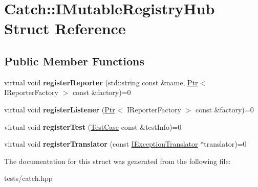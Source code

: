 \hypertarget{struct_catch_1_1_i_mutable_registry_hub}{}\section{Catch\+:\+:I\+Mutable\+Registry\+Hub Struct Reference}
\label{struct_catch_1_1_i_mutable_registry_hub}
\subsection*{Public Member Functions}
\begin{DoxyCompactItemize}
\item 
\mbox{\label{struct_catch_1_1_i_mutable_registry_hub_aab72d0aa1fa14627f1a6a4c893ae0a12}} 
virtual void {\bfseries register\+Reporter} (std\+::string const \&name, \hyperlink{class_catch_1_1_ptr}{Ptr}$<$ I\+Reporter\+Factory $>$ const \&factory)=0
\item 
\mbox{\label{struct_catch_1_1_i_mutable_registry_hub_ae06fcb90ba3f2b389d450cd81e229276}} 
virtual void {\bfseries register\+Listener} (\hyperlink{class_catch_1_1_ptr}{Ptr}$<$ I\+Reporter\+Factory $>$ const \&factory)=0
\item 
\mbox{\label{struct_catch_1_1_i_mutable_registry_hub_a11b85c6744d88c9f83fe16ad4a8dd451}} 
virtual void {\bfseries register\+Test} (\hyperlink{class_catch_1_1_test_case}{Test\+Case} const \&test\+Info)=0
\item 
\mbox{\label{struct_catch_1_1_i_mutable_registry_hub_ae6825365102693cf7707db022a2c2b49}} 
virtual void {\bfseries register\+Translator} (const \hyperlink{struct_catch_1_1_i_exception_translator}{I\+Exception\+Translator} $\ast$translator)=0
\end{DoxyCompactItemize}


The documentation for this struct was generated from the following file\+:\begin{DoxyCompactItemize}
\item 
tests/catch.\+hpp\end{DoxyCompactItemize}
